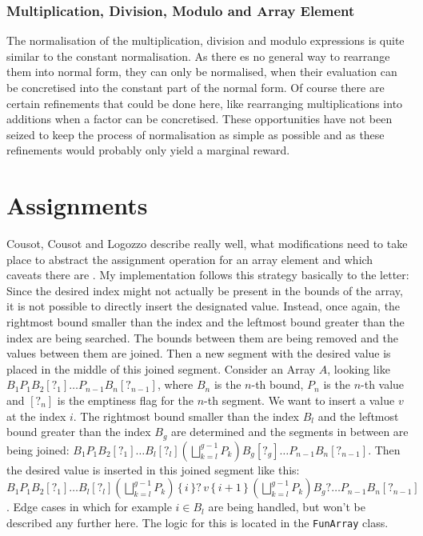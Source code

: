 \subsubsection{Multiplication, Division, Modulo and Array Element}

The normalisation of the multiplication, division and modulo expressions is quite similar to the constant normalisation. As there es no general way to rearrange them into normal form, they can only be normalised, when their evaluation can be concretised into the constant part of the normal form. Of course there are certain refinements that could be done here, like rearranging multiplications into additions when a factor can be concretised. These opportunities have not been seized to keep the process of normalisation as simple as possible and as these refinements would probably only yield a marginal reward. 








\section{Assignments}\label{sec:assignments}

Cousot, Cousot and Logozzo describe really well, what modifications need to take place to abstract the assignment operation for an array element and which caveats there are \cite[section 11.6]{cousot2011}. My implementation follows this strategy basically to the letter:
Since the desired index might not actually be present in the bounds of the array, it is not possible to directly insert the designated value. Instead, once again, the rightmost bound smaller than the index and the leftmost bound greater than the index are being searched. The bounds between them are being removed and the values between them are joined. Then a new segment with the desired value is placed in the middle of this joined segment. Consider an Array $A$, looking like $B_1P_1B_2[?_1]\ldots P_{n-1}B_n[?_{n-1}]$, where $B_n$ is the $n$-th bound, $P_n$ is the $n$-th value and $[?_{n}]$ is the emptiness flag for the $n$-th segment. We want to insert a value $v$ at the index $i$. The rightmost bound smaller than the index $B_l$ and the leftmost bound greater than the index $B_g$ are determined and the segments in between are being joined: $B_1P_1B_2[?_1]\ldots B_l[?_l] (\bigsqcup^{g-1}_{k=l}P_k) B_g[?_g]\ldots P_{n-1}B_n[?_{n-1}]$. Then the desired value  is inserted in this joined segment like this: $B_1P_1B_2[?_1]\ldots\allowbreak B_l[?_l] (\bigsqcup^{g-1}_{k=l}P_k)\allowbreak\, \{\,i\,\}?\, v \,\{\,i+1\,\}\, \allowbreak(\bigsqcup^{g-1}_{k=l}P_k) B_g?\ldots \allowbreak P_{n-1}B_n[?_{n-1}]$. Edge cases in which for example $i\in B_l$ are being handled, but won't be described any further here.  The logic for this is located in the \texttt{FunArray} class. 

